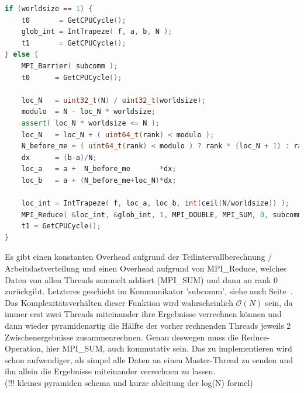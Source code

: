 \documentclass[12pt,a4paper]{article}
\begin{document}
\begin{center}\begin{minipage}{0.75\linewidth}
\begin{lstlisting}[language=C++,firstnumber=279, caption={Der Kern der numerischen Integration mitsamt Arbeitslastverteiler für mehrere Threads}, label=lst:kernberechnung]
if (worldsize == 1) {
    t0       = GetCPUCycle();
    glob_int = IntTrapeze( f, a, b, N );
    t1       = GetCPUCycle();
} else {
    MPI_Barrier( subcomm );
    t0      = GetCPUCycle();

    loc_N   = uint32_t(N) / uint32_t(worldsize);
    modulo  = N - loc_N * worldsize;
    assert( loc_N * worldsize <= N );
    loc_N   = loc_N + ( uint64_t(rank) < modulo );
    N_before_me = ( uint64_t(rank) < modulo ) ? rank * (loc_N + 1) : rank*loc_N + modulo;
    dx      = (b-a)/N;
    loc_a   = a +  N_before_me       *dx;
    loc_b   = a + (N_before_me+loc_N)*dx;
    
    loc_int = IntTrapeze( f, loc_a, loc_b, int(ceil(N/worldsize)) );
    MPI_Reduce( &loc_int, &glob_int, 1, MPI_DOUBLE, MPI_SUM, 0, subcomm );
    t1 = GetCPUCycle();
}
\end{lstlisting}\end{minipage}\end{center}

Es gibt einen konstanten Overhead aufgrund der Teilintervallberechnung / Arbeitslastverteilung und einen Overhead aufgrund von MPI\_Reduce, welches Daten von allen Threads sammelt  addiert (MPI\_SUM) und dann an rank 0 zurückgibt. Letzteres geschieht im Kommunikator 'subcomm', siehe auch Seite~\pageref{pg:subcomm}. Das Komplexitätsverhälten dieser Funktion wird wahrscheinlich $\mathcal{O}(N)$ sein, da immer erst zwei Threads miteinander ihre Ergebnisse verrechnen können und dann wieder pyramidenartig die Hälfte der vorher rechnenden Threads jeweils 2 Zwischenergebnisse zusammenrechnen. Genau deswegen muss die Reduce-Operation, hier MPI\_SUM, auch kommutativ sein. Das zu implementieren wird schon aufwendiger, als simpel alle Daten an einen Master-Thread zu senden und ihn allein die Ergebnisse miteinander verrechnen zu lassen.\\
(!!! kleines pyramiden schema und kurze ableitung der log(N) formel)\\
\end{document}
